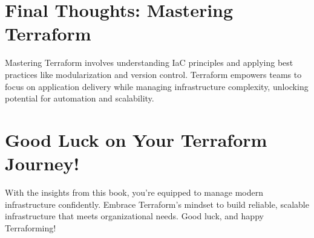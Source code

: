\section{Final Thoughts: Mastering Terraform}

Mastering Terraform involves understanding IaC principles and applying best practices like modularization and version control. Terraform empowers teams to focus on application delivery while managing infrastructure complexity, unlocking potential for automation and scalability.

\section{Good Luck on Your Terraform Journey!}

With the insights from this book, you're equipped to manage modern infrastructure confidently. Embrace Terraform's mindset to build reliable, scalable infrastructure that meets organizational needs. Good luck, and happy Terraforming!
